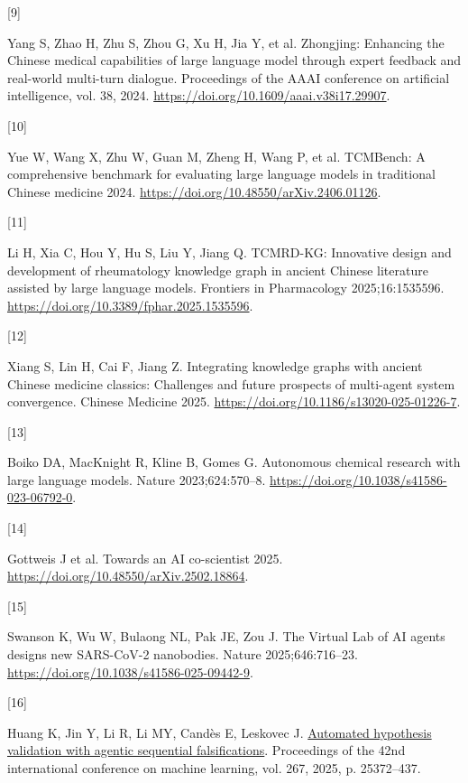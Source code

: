 \documentclass[
]{article}
\newlength{\cslhangindent}
\newlength{\csllabelwidth}
\newlength{\cslentryspacingunit} %
\newenvironment{CSLReferences}[2] %
 {%
  \setlength{\parindent}{0pt}
  \ifodd #1
  \let\oldpar\par
  \def\par{\hangindent=\cslhangindent\oldpar}
  \fi
  \setlength{\parskip}{#2\cslentryspacingunit}
 }%
 {}
\newcommand{\CSLLeftMargin}[1]{\parbox[t]{\csllabelwidth}{#1}}
\newcommand{\CSLRightInline}[1]{\parbox[t]{\linewidth - \csllabelwidth}{#1}\break}
\begin{document}
\begin{CSLReferences}{0}{0}
\leavevmode{}%
\CSLLeftMargin{{[}9{]} }%
\CSLRightInline{Yang S, Zhao H, Zhu S, Zhou G, Xu H, Jia Y, et al.
Zhongjing: Enhancing the {Chinese} medical capabilities of large
language model through expert feedback and real-world multi-turn
dialogue. Proceedings of the AAAI conference on artificial intelligence,
vol. 38, 2024. \url{https://doi.org/10.1609/aaai.v38i17.29907}.}

\leavevmode{}%
\CSLLeftMargin{{[}10{]} }%
\CSLRightInline{Yue W, Wang X, Zhu W, Guan M, Zheng H, Wang P, et al.
{TCMBench}: A comprehensive benchmark for evaluating large language
models in traditional {Chinese} medicine 2024.
\url{https://doi.org/10.48550/arXiv.2406.01126}.}

\leavevmode{}%
\CSLLeftMargin{{[}11{]} }%
\CSLRightInline{Li H, Xia C, Hou Y, Hu S, Liu Y, Jiang Q. {TCMRD-KG}:
Innovative design and development of rheumatology knowledge graph in
ancient {Chinese} literature assisted by large language models.
Frontiers in Pharmacology 2025;16:1535596.
\url{https://doi.org/10.3389/fphar.2025.1535596}.}

\leavevmode{}%
\CSLLeftMargin{{[}12{]} }%
\CSLRightInline{Xiang S, Lin H, Cai F, Jiang Z. Integrating knowledge
graphs with ancient {Chinese} medicine classics: Challenges and future
prospects of multi-agent system convergence. Chinese Medicine 2025.
\url{https://doi.org/10.1186/s13020-025-01226-7}.}

\leavevmode{}%
\CSLLeftMargin{{[}13{]} }%
\CSLRightInline{Boiko DA, MacKnight R, Kline B, Gomes G. Autonomous
chemical research with large language models. Nature 2023;624:570--8.
\url{https://doi.org/10.1038/s41586-023-06792-0}.}

\leavevmode{}%
\CSLLeftMargin{{[}14{]} }%
\CSLRightInline{Gottweis J et al. Towards an {AI} co-scientist 2025.
\url{https://doi.org/10.48550/arXiv.2502.18864}.}

\leavevmode{}%
\CSLLeftMargin{{[}15{]} }%
\CSLRightInline{Swanson K, Wu W, Bulaong NL, Pak JE, Zou J. The {Virtual
Lab} of {AI} agents designs new {SARS-CoV-2} nanobodies. Nature
2025;646:716--23. \url{https://doi.org/10.1038/s41586-025-09442-9}.}

\leavevmode{}%
\CSLLeftMargin{{[}16{]} }%
\CSLRightInline{Huang K, Jin Y, Li R, Li MY, Candès E, Leskovec J.
\href{https://proceedings.mlr.press/v267/huang25n.html}{Automated
hypothesis validation with agentic sequential falsifications}.
Proceedings of the 42nd international conference on machine learning,
vol. 267, 2025, p. 25372--437.}


\end{CSLReferences}
\end{document}
